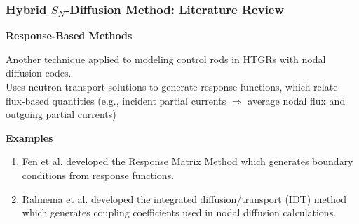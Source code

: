 \begin{frame}[noframenumbering]
  \frametitle{Hybrid $S_N$-Diffusion Method: Literature Review}
  \textbf{Response-Based Methods}
  \vspace{.3cm}

  Another technique applied to modeling control rods in HTGRs with nodal diffusion codes. \\
  Uses neutron transport solutions to generate response functions, which relate flux-based
  quantities (e.g., incident partial currents $\Rightarrow$ average nodal flux and outgoing partial
  currents)
  \vspace{.3cm}

  \textbf{Examples}
  \begin{enumerate}
    \item Fen et al. \cite{fen_modelling_1992} developed the Response Matrix Method which generates
      boundary conditions from response functions.
    \item Rahnema et al. \cite{rahnema_advanced_2011} developed the integrated diffusion/transport
      (IDT) method which generates coupling coefficients used in nodal diffusion calculations.
  \end{enumerate}
\end{frame}

